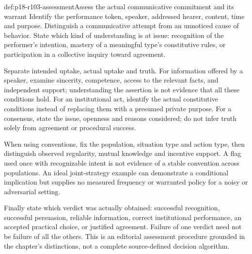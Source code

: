 \begin{hbmethod}{def:p18-r103-assessment}{Assess the actual communicative commitment and its warrant}
Identify the performance token, speaker, addressed hearer, content, time
and purpose. Distinguish a communicative attempt from an unnoticed cause
of behavior. State which kind of understanding is at issue: recognition
of the performer's intention, mastery of a meaningful type's constitutive
rules, or participation in a collective inquiry toward agreement.

Separate intended uptake, actual uptake and truth. For information offered
by a speaker, examine sincerity, competence, access to the relevant facts,
and independent support; understanding the assertion is not evidence
that all these conditions hold. For an institutional act, identify the
actual constitutive conditions instead of replacing them with a presumed
private purpose. For a consensus, state the issue, openness and reasons
considered; do not infer truth solely from agreement or procedural success.

When using conventions, fix the population, situation type and action
type, then distinguish observed regularity, mutual knowledge and incentive
support. A flag used once with recognizable intent is not evidence of a
stable convention across populations. An ideal joint-strategy example
can demonstrate a conditional implication but supplies no measured
frequency or warranted policy for a noisy or adversarial setting.

Finally state which verdict was actually obtained: successful recognition,
successful persuasion, reliable information, correct institutional
performance, an accepted practical choice, or justified agreement.
Failure of one verdict need not be failure of all the others. This is an
editorial assessment procedure grounded in the chapter's distinctions,
not a complete source-defined decision algorithm.
\end{hbmethod}
